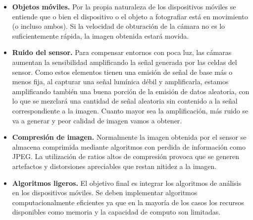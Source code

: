 \begin{itemize}
\item\textbf{Objetos móviles.} Por la propia naturaleza de los dispositivos móviles se entiende que o bien el dispositivo o el objeto a fotografiar está en movimiento (o incluso ambos). Si la velocidad de obturación de la cámara no es lo suficientemente rápida, la imagen obtenida estará movida.
\item\textbf{Ruido del sensor.} Para compensar entornos con poca luz, las cámaras aumentan la sensibilidad amplificando la señal generada por las celdas del sensor. Como estos elementos tienen una emisión de señal de base más o menos fija, al capturar una señal lumínica débil y amplificarla, estamos amplificando también una buena porción de la emisión de datos aleatoria, con lo que se mezclará una cantidad de señal aleatoria sin contenido a la señal correspondiente a la imagen. Cuanto mayor sea la amplificación, más ruido se va a generar y peor calidad de imagen vamos a obtener. 
\item\textbf{Compresión de imagen.} Normalmente la imagen obtenida por el sensor se almacena comprimida mediante algoritmos con perdida de información como JPEG. La utilización de ratios altos de compresión provoca que se generen artefactos y distorsiones apreciables que restan nitidez a la imagen.
\item\textbf{Algoritmos ligeros.} El objetivo final es integrar los algoritmos de análisis en los dispositivos móviles. Se deben implementar algoritmos computacionalmente eficientes ya que en la mayoría de los casos los recursos disponibles como memoria  y la capacidad de computo son limitadas.
\end{itemize}




